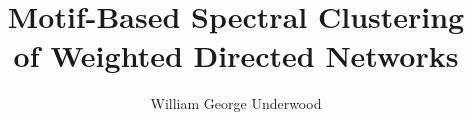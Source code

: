 


\title{Motif\hspace*{0.05cm}-Based Spectral Clustering\\[1ex]   %
       of Weighted Directed Networks}        %

\author{William George Underwood}

\renewcommand{\submittedtext}{}





\theoremstyle{plain}
\newtheorem{theorem}{Theorem}[chapter]
\newtheorem{proposition}{Proposition}[chapter]

\theoremstyle{definition}
\newtheorem{definition}{Definition}[chapter]
\newtheorem{example}{Example}[chapter]
\newtheorem{prf}{Proof}[chapter]

\theoremstyle{remark}
\newtheorem*{remark}{Remark}
\newtheorem*{notation}{Notation}










\DontPrintSemicolon

\makeatletter
\renewcommand{\SetKwInOut}[2]{%
  \sbox\algocf@inoutbox{\KwSty{#2}\algocf@typo:}%
  \expandafter\ifx\csname InOutSizeDefined\endcsname\relax%
    \newcommand\InOutSizeDefined{}\setlength{\inoutsize}{\wd\algocf@inoutbox}%
    \sbox\algocf@inoutbox{\parbox[t]{\inoutsize}{\KwSty{#2}\algocf@typo:\hfill}~}\setlength{\inoutindent}{\wd\algocf@inoutbox}%
  \else%
    \ifdim\wd\algocf@inoutbox>\inoutsize%
    \setlength{\inoutsize}{\wd\algocf@inoutbox}%
    \sbox\algocf@inoutbox{\parbox[t]{\inoutsize}{\KwSty{#2}\algocf@typo:\hfill}~}\setlength{\inoutindent}{\wd\algocf@inoutbox}%
    \fi%
  \fi%
  \algocf@newcommand{#1}[1]{%
    \ifthenelse{\boolean{algocf@inoutnumbered}}{\relax}{\everypar={\relax}}%
    {\let\\\algocf@newinout\hangindent=\inoutindent\hangafter=1\parbox[t]{\inoutsize}{\KwSty{#2}\algocf@typo:\hfill}~##1\par}%
    \algocf@linesnumbered%
  }}%
\makeatother

